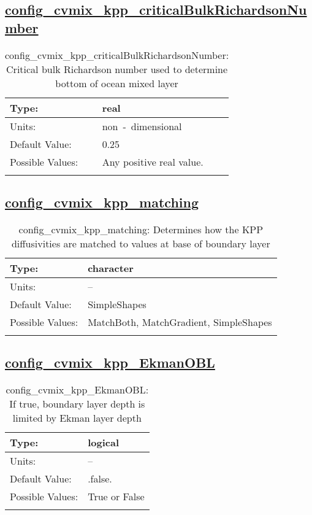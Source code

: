 \subsection[config\_cvmix\_kpp\_criticalBulkRichardsonNumber]{\hyperref[sec:nm_tab_cvmix]{config\_cvmix\_kpp\_criticalBulkRichardsonNumber}}
\label{subsec:nm_sec_config_cvmix_kpp_criticalBulkRichardsonNumber}
\begin{center}
\begin{longtable}{| p{2.0in} || p{4.0in} |}
    \hline
    Type: & real \\
    \hline
    Units: & \si{non-dimensional} \\
    \hline
    Default Value: & 0.25 \\
    \hline
    Possible Values: & Any positive real value. \\
    \hline
    \caption{config\_cvmix\_kpp\_criticalBulkRichardsonNumber: Critical bulk Richardson number used to determine bottom of ocean mixed layer}
\end{longtable}
\end{center}
\subsection[config\_cvmix\_kpp\_matching]{\hyperref[sec:nm_tab_cvmix]{config\_cvmix\_kpp\_matching}}
\label{subsec:nm_sec_config_cvmix_kpp_matching}
\begin{center}
\begin{longtable}{| p{2.0in} || p{4.0in} |}
    \hline
    Type: & character \\
    \hline
    Units: & -- \\
    \hline
    Default Value: & SimpleShapes \\
    \hline
    Possible Values: & MatchBoth, MatchGradient, SimpleShapes \\
    \hline
    \caption{config\_cvmix\_kpp\_matching: Determines how the KPP diffusivities are matched to values at base of boundary layer}
\end{longtable}
\end{center}
\subsection[config\_cvmix\_kpp\_EkmanOBL]{\hyperref[sec:nm_tab_cvmix]{config\_cvmix\_kpp\_EkmanOBL}}
\label{subsec:nm_sec_config_cvmix_kpp_EkmanOBL}
\begin{center}
\begin{longtable}{| p{2.0in} || p{4.0in} |}
    \hline
    Type: & logical \\
    \hline
    Units: & -- \\
    \hline
    Default Value: & .false. \\
    \hline
    Possible Values: & True or False \\
    \hline
    \caption{config\_cvmix\_kpp\_EkmanOBL: If true, boundary layer depth is limited by Ekman layer depth}
\end{longtable}
\end{center}
